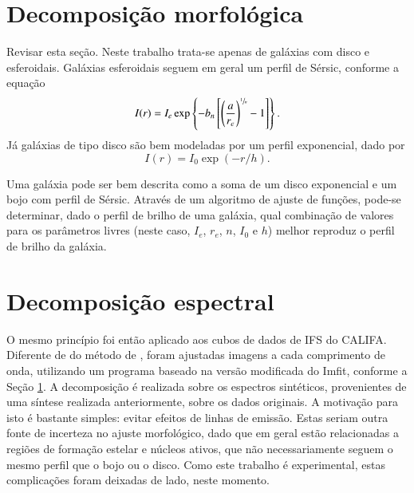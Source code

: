 \section{Decomposição morfológica}
\label{sec:Decomp:decomp}
 

\TODO Revisar esta seção. Neste trabalho trata-se apenas de galáxias com disco e
esferoidais.
Galáxias esferoidais seguem em geral um perfil de Sérsic, conforme a equação
\begin{equation*}
I(r) = I_e \exp \left\{- b_n \left[ \left( \frac{a}{r_e} \right)^{\sfrac{1}{n}}
- 1 \right] \right\}.
\end{equation*}
Já galáxias de tipo disco são bem modeladas por um perfil exponencial, dado por
\begin{equation*}
I(r) = I_0 \exp \left(- r / h \right).
\end{equation*}

Uma galáxia pode ser bem descrita como a soma de um disco exponencial e um bojo
com perfil de Sérsic. Através de um algoritmo de ajuste de funções, pode-se
determinar, dado o perfil de brilho de uma galáxia, qual combinação de valores
para os parâmetros livres (neste caso, $I_e$, $r_e$, $n$, $I_0$ e $h$) melhor
reproduz o perfil de brilho da galáxia.



\section{Decomposição espectral}

O mesmo princípio foi então aplicado aos cubos de dados de IFS do CALIFA.
Diferente de do método de \citeauthor{Johnston2012}, foram ajustadas imagens a
cada comprimento de onda, utilizando um programa baseado na versão modificada do
Imfit, conforme a Seção \ref{sec:Decomp:decomp}. A decomposição é realizada
sobre os espectros sintéticos\fixme, provenientes de uma síntese realizada
anteriormente, sobre os dados originais. A motivação para isto é bastante
simples: evitar efeitos de linhas de emissão.
Estas seriam outra fonte de incerteza no ajuste morfológico, dado que em geral
estão relacionadas a regiões de formação estelar e núcleos ativos, que não
necessariamente seguem o mesmo perfil que o bojo ou o disco. Como este trabalho
é experimental, estas complicações foram deixadas de lado, neste momento.

